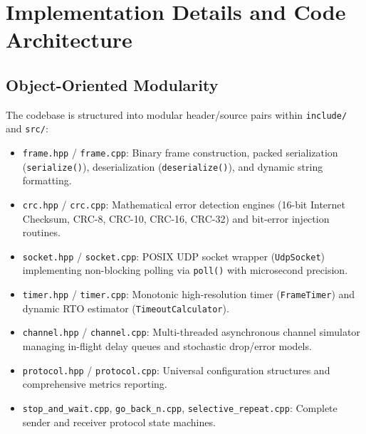 \documentclass[11pt,a4paper]{article}
\begin{document}
\FloatBarrier
\section{Implementation Details and Code Architecture}

\subsection{Object-Oriented Modularity}
The codebase is structured into modular header/source pairs within \texttt{include/} and \texttt{src/}:
\begin{itemize}
    \item \texttt{frame.hpp} / \texttt{frame.cpp}: Binary frame construction, packed serialization (\texttt{serialize()}), deserialization (\texttt{deserialize()}), and dynamic string formatting.
    \item \texttt{crc.hpp} / \texttt{crc.cpp}: Mathematical error detection engines (16-bit Internet Checksum, CRC-8, CRC-10, CRC-16, CRC-32) and bit-error injection routines.
    \item \texttt{socket.hpp} / \texttt{socket.cpp}: POSIX UDP socket wrapper (\texttt{UdpSocket}) implementing non-blocking polling via \texttt{poll()} with microsecond precision.
    \item \texttt{timer.hpp} / \texttt{timer.cpp}: Monotonic high-resolution timer (\texttt{FrameTimer}) and dynamic RTO estimator (\texttt{TimeoutCalculator}).
    \item \texttt{channel.hpp} / \texttt{channel.cpp}: Multi-threaded asynchronous channel simulator managing in-flight delay queues and stochastic drop/error models.
    \item \texttt{protocol.hpp} / \texttt{protocol.cpp}: Universal configuration structures and comprehensive metrics reporting.
    \item \texttt{stop\_and\_wait.cpp}, \texttt{go\_back\_n.cpp}, \texttt{selective\_repeat.cpp}: Complete sender and receiver protocol state machines.
\end{itemize}
\end{document}

